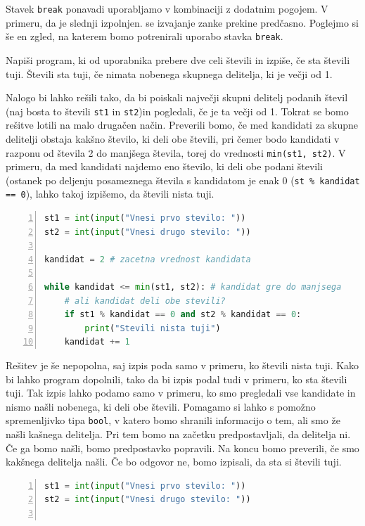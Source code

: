 Stavek \texttt{break} ponavadi uporabljamo v kombinaciji z dodatnim pogojem. V primeru, da je slednji izpolnjen. se izvajanje zanke prekine predčasno. Poglejmo si še en zgled, na katerem bomo potrenirali uporabo stavka \texttt{break}. 

\begin{zgled}
Napiši program, ki od uporabnika prebere dve celi števili in izpiše, če sta števili tuji. Števili sta tuji, če nimata nobenega skupnega delitelja, ki je večji od 1.
\end{zgled}
\begin{resitev}
Nalogo bi lahko rešili tako, da bi poiskali največji skupni delitelj podanih števil (naj bosta to števili \texttt{st1} in \texttt{st2})in pogledali, če je ta večji od 1. Tokrat se bomo rešitve lotili na malo drugačen način. Preverili bomo, če med kandidati za skupne delitelji obstaja kakšno število, ki deli obe števili, pri čemer bodo kandidati v razponu od števila 2 do manjšega števila, torej do vrednosti \texttt{min(st1, st2)}. V primeru, da med kandidati najdemo eno število, ki deli obe podani števili (ostanek po deljenju posameznega števila s kandidatom je enak 0 (\texttt{st \% kandidat == 0}), lahko takoj izpišemo, da števili nista tuji.
\begin{lstlisting}[language=Python,numbers=left]
st1 = int(input("Vnesi prvo stevilo: "))
st2 = int(input("Vnesi drugo stevilo: "))

kandidat = 2 # zacetna vrednost kandidata

while kandidat <= min(st1, st2): # kandidat gre do manjsega
    # ali kandidat deli obe stevili?
    if st1 % kandidat == 0 and st2 % kandidat == 0:
        print("Stevili nista tuji")
    kandidat += 1
\end{lstlisting}
Rešitev je še nepopolna, saj izpis poda samo v primeru, ko števili nista tuji. Kako bi lahko program dopolnili, tako da bi izpis podal tudi v primeru, ko sta števili tuji. Tak izpis lahko podamo samo v primeru, ko smo pregledali vse kandidate in nismo našli nobenega, ki deli obe števili. Pomagamo si lahko s pomožno spremenljivko tipa \texttt{bool}, v katero bomo shranili informacijo o tem, ali smo že našli kašnega delitelja. Pri tem bomo na začetku predpostavljali, da delitelja ni. Če ga bomo našli, bomo predpostavko popravili. Na koncu bomo preverili, če smo kakšnega delitelja našli. Če bo odgovor ne, bomo izpisali, da sta si števili tuji.
\begin{lstlisting}[language=Python,numbers=left]
st1 = int(input("Vnesi prvo stevilo: "))
st2 = int(input("Vnesi drugo stevilo: "))


\end{lstlisting}
\end{resitev}
